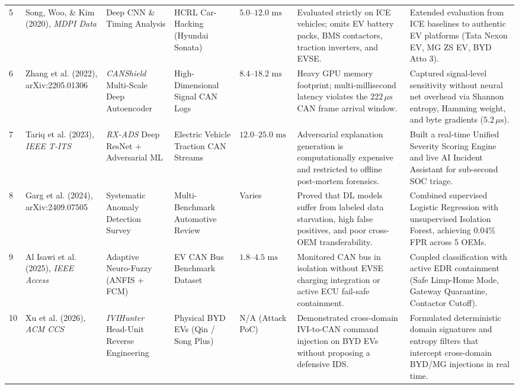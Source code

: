 \documentclass[conference]{IEEEtran}
\begin{document}
\begin{table}[!t]
{\begin{tabular}{p{0.3cm} p{2.8cm} p{2.3cm} p{2.2cm} p{1.1cm} p{4.2cm} p{4.5cm}}
5 & Song, Woo, \& Kim (2020), \textit{MDPI Data} \cite{song2020} & Deep CNN \& Timing Analysis & HCRL Car-Hacking (Hyundai Sonata) & $5.0\text{--}12.0\text{ ms}$ & Evaluated strictly on ICE vehicles; omits EV battery packs, BMS contactors, traction inverters, and EVSE. & Extended evaluation from ICE baselines to authentic EV platforms (Tata Nexon EV, MG ZS EV, BYD Atto 3). \\
6 & Zhang et al. (2022), arXiv:2205.01306 \cite{zhang2022} & \textit{CANShield} Multi-Scale Deep Autoencoder & High-Dimensional Signal CAN Logs & $8.4\text{--}18.2\text{ ms}$ & Heavy GPU memory footprint; multi-millisecond latency violates the $222\,\mu\text{s}$ CAN frame arrival window. & Captured signal-level sensitivity without neural net overhead via Shannon entropy, Hamming weight, and byte gradients ($5.2\,\mu\text{s}$). \\
7 & Tariq et al. (2023), \textit{IEEE T-ITS} \cite{tariq2022} & \textit{RX-ADS} Deep ResNet + Adversarial ML & Electric Vehicle Traction CAN Streams & $12.0\text{--}25.0\text{ ms}$ & Adversarial explanation generation is computationally expensive and restricted to offline post-mortem forensics. & Built a real-time Unified Severity Scoring Engine and live AI Incident Assistant for sub-second SOC triage. \\
8 & Garg et al. (2024), arXiv:2409.07505 \cite{garg2024} & Systematic Anomaly Detection Survey & Multi-Benchmark Automotive Review & Varies & Proved that DL models suffer from labeled data starvation, high false positives, and poor cross-OEM transferability. & Combined supervised Logistic Regression with unsupervised Isolation Forest, achieving $0.04\%$ FPR across 5 OEMs. \\
9 & Al Isawi et al. (2025), \textit{IEEE Access} \cite{alisawi2025} & Adaptive Neuro-Fuzzy (ANFIS + FCM) & EV CAN Bus Benchmark Dataset & $1.8\text{--}4.5\text{ ms}$ & Monitored CAN bus in isolation without EVSE charging integration or active ECU fail-safe containment. & Coupled classification with active EDR containment (Safe Limp-Home Mode, Gateway Quarantine, Contactor Cutoff). \\
10 & Xu et al. (2026), \textit{ACM CCS} \cite{xu2026} & \textit{IVIHunter} Head-Unit Reverse Engineering & Physical BYD EVs (Qin / Song Plus) & N/A (Attack PoC) & Demonstrated cross-domain IVI-to-CAN command injection on BYD EVs without proposing a defensive IDS. & Formulated deterministic domain signatures and entropy filters that intercept cross-domain BYD/MG injections in real time. \\

\end{tabular}}
\end{table}
\end{document}

